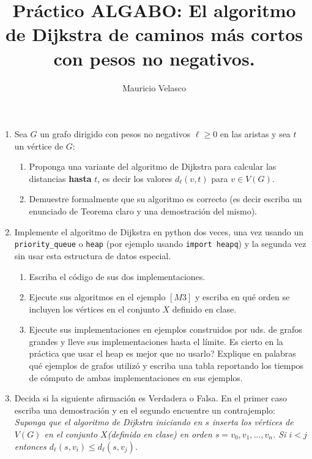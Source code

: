 \documentclass[12pt, a4paper]{article}
\date{}
\begin{document}
\title{Pr\'actico ALGABO: El algoritmo de Dijkstra de caminos m\'as cortos con pesos no negativos.}
\author{Mauricio Velasco}
\maketitle{}



\begin{enumerate} 

\item Sea $G$ un grafo dirigido con pesos no negativos $\ell\geq 0$ en las aristas y sea $t$ un v\'ertice de $G$:
\begin{enumerate}
\item  Proponga una variante del algoritmo de Dijkstra para calcular las distancias {\bf hasta } $t$, es decir los valores $d_{\ell}(v,t)$ para $v\in V(G)$. 
\item Demuestre formalmente que su algoritmo es correcto (es decir escriba un enunciado de Teorema claro y una demostración del mismo).
\end{enumerate}

\item Implemente el algoritmo de Dijkstra en python dos veces, una vez usando un \verb!priority_queue! o \verb!heap! (por ejemplo usando \verb!import heapq!) y la segunda vez sin usar esta estructura de datos especial.
\begin{enumerate}
\item Escriba el c\'odigo de sus dos implementaciones.
\item Ejecute sus algoritmos en el ejemplo $[M3]$ y escriba en qu\'e orden se incluyen los v\'ertices en el conjunto $X$ definido en clase.
\item Ejecute sus implementaciones en ejemplos construidos por uds. de grafos grandes y lleve sus implementaciones hasta el l\'imite. Es cierto en la pr\'actica que usar el heap es mejor que no usarlo? Explique en palabras qu\'e ejemplos de grafos utiliz\'o y escriba una tabla reportando los tiempos de cómputo de ambas implementaciones en sus ejemplos.
\end{enumerate}

\item Decida si la siguiente afirmación es Verdadera o Falsa. En el primer caso escriba una demostraci\'on y en el segundo encuentre un contrajemplo: {\it Suponga que el algoritmo de Dijkstra iniciando en $s$ inserta los v\'ertices de $V(G)$ en el conjunto $X$(definido en clase) en orden  $s=v_0,v_1,\dots, v_n$. Si $i<j$ entonces $d_{\ell}(s,v_i)\leq d_{\ell}(s,v_j)$.}



\end{enumerate}
\end{document}
